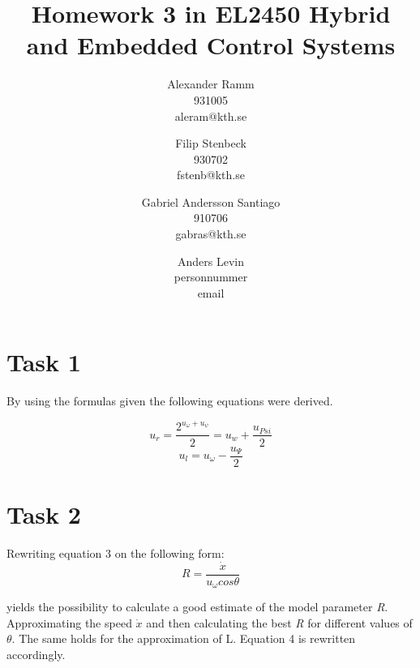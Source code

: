 \documentclass[a4paper,12pt,oneside,onecolumn]{article} %
\begin{document}

\title{Homework 3 in EL2450 Hybrid and Embedded Control Systems}
\author{
  Alexander Ramm \\ 931005 \\ aleram@kth.se 
  \and 
  Filip Stenbeck \\ 930702 \\ fstenb@kth.se
  \and
  Gabriel Andersson Santiago \\ 910706 \\ gabras@kth.se
  \and
  Anders Levin \\ personnummer \\ email
  \and
  }

\maketitle                     %
\newpage







\section*{Task 1}

By using the formulas given the following equations were derived.

\begin{equation}
u_r = \frac{2^{u_{\omega} + u_{\psi}}}{2} = u_w + \frac{u_{Psi}}{2}
\end{equation}
\begin{equation}
u_l = u_\omega - \frac{u_\Psi}{2}
\end{equation}

\section*{Task 2}


Rewriting equation 3 on the following form:
\begin{equation}
R = \frac{\dot{x}}{u_\omega cos \theta}
\end{equation}

yields the possibility to calculate a good estimate of the model parameter \emph{R}. Approximating the speed $\dot{x}$ and then calculating the best \emph{R} for different values of $\theta$. The same holds for the approximation of L. Equation 4 is rewritten accordingly. 
\end{document}
